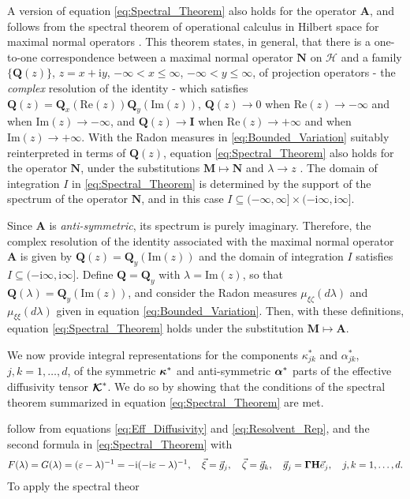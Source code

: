 \documentclass[11pt]{amsart}
\newcommand{\I}{\mathrm{i}}
\newcommand{\Mb}{\mathbf{M}}
\newcommand{\Hb}{\mathbf{H}}
\newcommand{\Ib}{\mathbf{I}}
\newcommand{\Ab}{\mathbf{A}}
\newcommand{\Qb}{\mathbf{Q}}
\newcommand{\Nb}{\mathbf{N}}
\newcommand\Kbc{\mbox{\boldmath${\mathcal{K}}$}}
\newcommand{\Hs}{\mathscr{H}}
\newcommand\balpha{\mbox{\boldmath${\alpha}$}}
\newcommand\bkappa{\mbox{\boldmath${\kappa}$}}
\newcommand\bGamma{\mbox{\boldmath${\Gamma}$}}
\begin{document}
A version of equation \eqref{eq:Spectral_Theorem} also holds for the  
operator $\Ab$, and follows from the spectral theorem of
operational calculus in Hilbert space for maximal normal operators
\cite{Stone:64}. This theorem states, in general, that there is a
one-to-one correspondence between a maximal normal operator $\Nb$
on $\Hs$ and a family $\{\Qb(z)\}$, $z=x+\I y$, $-\infty<x\leq\infty$, $-\infty<y\leq\infty$, of
projection operators - the \emph{complex} resolution of the identity -
which satisfies $\Qb(z)=\Qb_x(\text{Re}(z))\Qb_y(\text{Im}(z))$,
$\Qb(z)\to0$ when $\text{Re}(z)\to-\infty$ and when $\text{Im}(z)\to-\infty$, and
$\Qb(z)\to\Ib$ when $\text{Re}(z)\to+\infty$ and when $\text{Im}(z)\to+\infty$. With
the Radon measures in \eqref{eq:Bounded_Variation} suitably
reinterpreted in terms of $\Qb(z)$, equation
\eqref{eq:Spectral_Theorem} also holds for the operator $\Nb$, under
the substitutions $\Mb\mapsto\Nb$ and $\lambda\to z$ \cite{Stone:64}.  The domain of
integration $I$ in \eqref{eq:Spectral_Theorem} is determined by the
support of the spectrum of the operator $\Nb$, and in this case
$I\subseteq(-\infty,\infty]\times(-\I\infty,\I\infty]$.  




Since $\Ab$ is \emph{anti-symmetric}, its spectrum is purely
imaginary. Therefore, the complex resolution of the 
identity associated with the maximal normal operator $\Ab$ is given by
$\Qb(z)=\Qb_y(\text{Im}(z))$ and the domain of integration $I$
satisfies $I\subseteq(-\I\infty,\I\infty]$. Define $\Qb=\Qb_y$ with $\lambda=\text{Im}(z)$, so
that $\Qb(\lambda)=\Qb_y(\text{Im}(z))$, and consider the Radon measures
$\mu_{\xi\zeta}(d\lambda)$ and $\mu_{\xi\xi}(d\lambda)$ given in equation
\eqref{eq:Bounded_Variation}. Then, with these definitions, equation 
\eqref{eq:Spectral_Theorem} holds under the substitution $\Mb\mapsto\Ab$.         



We now provide integral representations for the components $\kappa^*_{jk}$
and $\alpha^*_{jk}$, $j,k=1,\ldots,d$, of the symmetric $\bkappa^*$ and
anti-symmetric $\balpha^*$ parts of the effective diffusivity tensor
$\Kbc^*$. We do so by showing that the conditions of the spectral
theorem summarized in equation \eqref{eq:Spectral_Theorem} are met.

follow from equations \eqref{eq:Eff_Diffusivity} and
\eqref{eq:Resolvent_Rep}, and the second formula in
\eqref{eq:Spectral_Theorem} with   
\begin{align}\label{eq:F_G}
  F(\lambda)=G(\lambda)=(\varepsilon-\lambda)^{-1}=-\I(-\I\varepsilon-\lambda)^{-1}, \quad
  \vec{\xi}=\vec{g}_j, \quad
  \vec{\zeta}=\vec{g}_k, \quad
  \vec{g}_j=\bGamma\Hb\vec{e}_j,
  \quad  j,k=1,\ldots,d.
\end{align}
%
To apply the spectral theor
\end{document}
